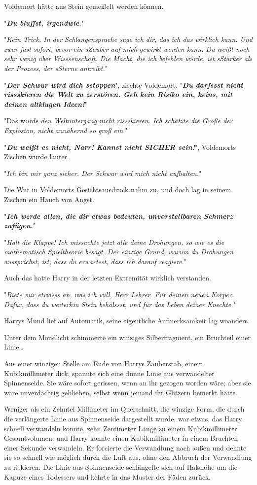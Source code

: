{Voldemort hätte aus Stein gemeißelt werden können.

"\textbf{\emph{Du bluffst, irgendwie}}."

"\emph{Kein Trick. In der Schlangensprache sage ich dir, das ich das wirklich kann. Und zwar fast sofort, bevor ein sZauber auf mich gewirkt werden kann. Du weißt noch sehr wenig über Wisssenschaft. Die Macht, die ich befehlen würde, ist sStärker als der Prozess, der sSterne antreibt.}"

"\textbf{\emph{Der Schwur wird dich sstoppen}}", zischte Voldemort. "\textbf{\emph{Du darfssst nicht rissskieren die Welt zu zerstören. Geh kein Risiko ein, keins, mit deinen altklugen Ideen!}}"

"Das w\emph{ürde den Weltuntergang nicht rissskieren. Ich schätzte die Größe der Explosion, nicht annähernd so groß ein.}"

"\textbf{\emph{Du weißt es nicht, Narr! Kannst nicht SICHER sein!}}", Voldemorts Zischen wurde lauter.

"\emph{Ich bin mir ganz sicher. Der Schwur wird mich nicht aufhalten.}"

Die Wut in Voldemorts Gesichtsausdruck nahm zu, und doch lag in seinem Zischen ein Hauch von Angst.

"\textbf{\emph{Ich werde allen, die dir etwas bedeuten, unvorstellbaren Schmerz zufügen.}}"

"\emph{Halt die Klappe! Ich missachte jetzt alle deine Drohungen, so wie es die mathematisch Spieltheorie besagt. Der einzige Grund, warum du Drohungen aussprichst, ist, dass du erwartest, dass ich darauf reagiere}."

Auch das hatte Harry in der letzten Extremität wirklich verstanden.

"\emph{Biete mir etwasss an, was ich will, Herr Lehrer. Für deinen neuen Körper. Dafür, dass du weiterhin Stein behälssst, und für das Leben deiner Knechte.}"

Harrys Mund lief auf Automatik, seine eigentliche Aufmerksamkeit lag woanders.

Unter dem Mondlicht schimmerte ein winziges Silberfragment, ein Bruchteil einer Linie…

Aus einer winzigen Stelle am Ende von Harrys Zauberstab, einem Kubikmillimeter dick, spannte sich eine dünne Linie aus verwandelter Spinnenseide. Sie wäre sofort gerissen, wenn an ihr gezogen worden wäre; aber sie wäre unverdächtig geblieben, selbst wenn jemand ihr Glitzern bemerkt hätte.

Weniger als ein Zehntel Millimeter im Querschnitt, die winzige Form, die durch die verlängerte Linie aus Spinnenseide dargestellt wurde, war etwas, das Harry schnell verwandeln konnte, zehn Zentimeter Länge zu einem Kubikmillimeter Gesamtvolumen; und Harry konnte einen Kubikmillimeter in einem Bruchteil einer Sekunde verwandeln. Er forcierte die Verwandlung nach außen und dehnte sie so schnell wie möglich durch die Luft aus, ohne den Abbruch der Verwandlung zu riskieren. Die Linie aus Spinnenseide schlängelte sich auf Halshöhe um die Kapuze eines Todessers und kehrte in das Muster der Fäden zurück.

}
